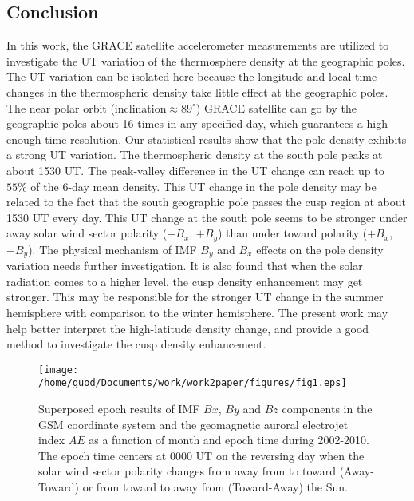 \documentclass[draft, grl]{/home/guod/Documents/template/agu_template/AGUTeX}
\begin{document}
\begin{article}
\section{Conclusion}
    In this work, the GRACE satellite accelerometer measurements are utilized
    to investigate the UT variation of the thermosphere density at the 
    geographic poles. 
    The UT variation can be isolated here because the longitude and local time 
    changes in the thermospheric density take little effect at the geographic
    poles. 
    The near polar orbit (inclination$\approx89^\circ$) GRACE satellite can go
    by the geographic poles about 16 times in any specified day, which 
    guarantees a high enough time resolution. 
    Our statistical results show that the pole density exhibits a strong UT 
    variation. 
    The thermospheric density at the south pole peaks at about 1530 UT.
    The peak-valley difference in the UT change can reach up to $55\%$ of the 
    6-day mean density.
    This UT change in the pole density may be related to the fact that the 
    south geographic pole passes the cusp region at about 1530 UT every 
    day.
    This UT change at the south pole seems to be stronger under away solar wind
    sector polarity ($-B_x$, $+B_y$) than under toward polarity ($+B_x$, 
    $-B_y$).
    The physical mechanism of IMF $B_y$ and $B_x$ effects on the pole density
    variation needs further investigation.
    It is also found that when the solar radiation comes to a higher level, the
    cusp density enhancement may get stronger.
    This may be responsible for the stronger UT change in the summer hemisphere
    with comparison to the winter hemisphere.
    The present work may help better interpret the high-latitude density change,
    and provide a good method to investigate the cusp density enhancement.



\end{article}
\begin{figure}
    \centering
    \noindent\texttt{[image: /home/guod/Documents/work/work2paper/figures/fig1.eps]}
    \caption{Superposed epoch results of IMF $Bx$, $By$ and $Bz$ components
        in the GSM coordinate system and the geomagnetic auroral electrojet 
        index $AE$ as a function of month and epoch time during 2002-2010. 
        The epoch time centers at 0000 UT on the reversing day when the solar 
        wind sector polarity changes from away from to toward (Away-Toward) or
        from toward to away from (Toward-Away) the Sun. }
    \label{figure1}
\end{figure}
\end{document}
